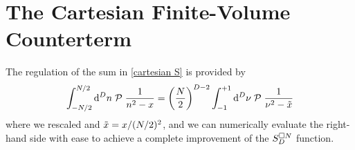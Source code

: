 \section{The Cartesian \Luscher Finite-Volume Counterterm}\label{sec:counterterm/cartesian}

The regulation of the sum in \eqref{cartesian S} is provided by
\begin{equation}
    \label{eq:cartesian integral}
    \int_{-N/2}^{N/2} \mathrm{d}^Dn\; \mathcal{P}\; \frac{1}{n^2-x}
    =
    \left(\frac{N}{2}\right)^{D-2} \int_{-1}^{+1} \mathrm{d}^D\nu\; \mathcal{P}\; \frac{1}{\nu^2 - \tilde{x}}
\end{equation}
where we rescaled and $\tilde{x}=x/(N/2)^2$, and we can numerically evaluate the right-hand side with ease to achieve a complete improvement of the $S_D^{\square N}$ function.

